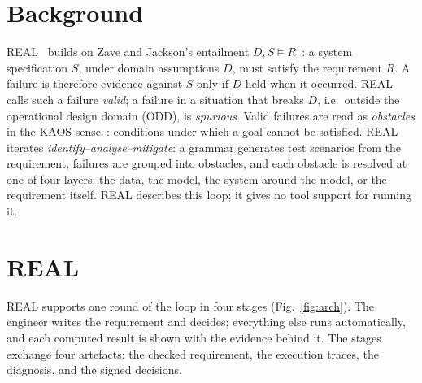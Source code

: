 \providecommand{\toolname}{REAL}
\providecommand{\todo}[1]{\textcolor{red}{[TODO: #1]}}

\section{Background}
\label{sec:background}

REAL~\cite{real2026} builds on Zave and Jackson's entailment
$D, S \models R$~\cite{zave1997}: a system specification $S$, under domain
assumptions $D$, must satisfy the requirement $R$. A failure is therefore
evidence against $S$ only if $D$ held when it occurred. REAL calls such a
failure \emph{valid}; a failure in a situation that breaks $D$, i.e.\ outside
the operational design domain (ODD), is \emph{spurious}. Valid failures are
read as \emph{obstacles} in the KAOS sense~\cite{lamsweerde2000}: conditions
under which a goal cannot be satisfied. REAL iterates
\emph{identify--analyse--mitigate}: a grammar generates test scenarios from
the requirement, failures are grouped into obstacles, and each obstacle is
resolved at one of four layers: the data, the model, the system around the
model, or the requirement itself. REAL describes this loop; it gives no
tool support for running it.

\section{\toolname}
\label{sec:tool}

\toolname{} supports one round of the loop in four stages
(Fig.~\ref{fig:arch}). The engineer writes the requirement and decides;
everything else runs automatically, and each computed result is shown with
the evidence behind it. The stages exchange four artefacts: the checked
requirement, the execution traces, the diagnosis, and the signed decisions.

